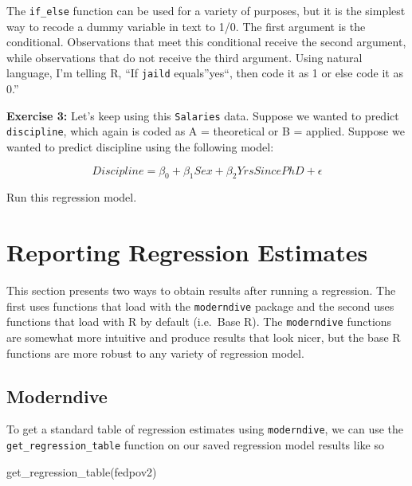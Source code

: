 \documentclass[
]{book}
\makeatletter
\newenvironment{Shaded}{\begin{snugshade}}{\end{snugshade}}
\newcommand{\FunctionTok}[1]{\textcolor[rgb]{0,0,0}{#1}}
\newcommand{\NormalTok}[1]{#1}
\newenvironment{kframe}{%
\medskip{}
\setlength{\fboxsep}{.8em}
 \def\at@end@of@kframe{}%
 \ifinner\ifhmode%
  \def\at@end@of@kframe{\end{minipage}}%
  \begin{minipage}{\columnwidth}%
 \fi\fi%
 \def\FrameCommand##1{\hskip\@totalleftmargin \hskip-\fboxsep
 \colorbox{shadecolor}{##1}\hskip-\fboxsep
     \hskip-\linewidth \hskip-\@totalleftmargin \hskip\columnwidth}%
 \MakeFramed {\advance\hsize-\width
   \@totalleftmargin\z@ \linewidth\hsize
   \@setminipage}}%
 {\par\unskip\endMakeFramed%
 \at@end@of@kframe}
\renewenvironment{Shaded}{\begin{kframe}}{\end{kframe}}
\newenvironment{rmdblock}[1]
  {\begin{shaded*}
  }
  {\end{shaded*}
  }
\newenvironment{learncheck}
  {\begin{rmdblock}{warning}}
  {\end{rmdblock}}
\makeatother
\begin{document}
The \texttt{if\_else} function can be used for a variety of purposes, but it is the simplest way to recode a dummy variable in text to 1/0. The first argument is the conditional. Observations that meet this conditional receive the second argument, while observations that do not receive the third argument. Using natural language, I'm telling R, ``If \texttt{jaild} equals''yes``, then code it as 1 or else code it as 0.''

\begin{learncheck}
\textbf{Exercise 3:} Let's keep using this \texttt{Salaries} data.
Suppose we wanted to predict \texttt{discipline}, which again is coded
as A = theoretical or B = applied. Suppose we wanted to predict
discipline using the following model:

\begin{equation}
Discipline = \beta_0 + \beta_1Sex + \beta_2YrsSincePhD + \epsilon
\end{equation}

Run this regression model.
\end{learncheck}

\hypertarget{reporting-regression-estimates}{%
\section{Reporting Regression Estimates}\label{reporting-regression-estimates}}

This section presents two ways to obtain results after running a regression. The first uses functions that load with the \texttt{moderndive} package and the second uses functions that load with R by default (i.e.~Base R). The \texttt{moderndive} functions are somewhat more intuitive and produce results that look nicer, but the base R functions are more robust to any variety of regression model.

\hypertarget{moderndive}{%
\subsection{Moderndive}\label{moderndive}}

To get a standard table of regression estimates using \texttt{moderndive}, we can use the \texttt{get\_regression\_table} function on our saved regression model results like so

\begin{Shaded}
\begin{Highlighting}[]
\FunctionTok{get\_regression\_table}\NormalTok{(fedpov2)}
\end{Highlighting}
\end{Shaded}
\end{document}
